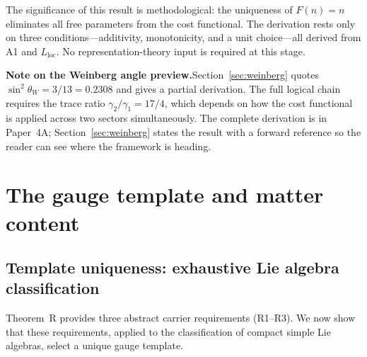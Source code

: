 \documentclass[11pt]{article}
\begin{document}
The significance of this result is methodological: the uniqueness of $F(n) = n$ eliminates all free parameters from the cost functional.  The derivation rests only on three conditions---additivity, monotonicity, and a unit choice---all derived from A1 and $L_{\mathrm{loc}}$.  No representation-theory input is required at this stage.

\smallskip
\noindent\textbf{Note on the Weinberg angle preview.}\quad Section~\ref{sec:weinberg} quotes $\sin^2\theta_W = 3/13 = 0.2308$ and gives a partial derivation.  The full logical chain requires the trace ratio $\gamma_2/\gamma_1 = 17/4$, which depends on how the cost functional is applied across two sectors simultaneously.  The complete derivation is in Paper~4A; Section~\ref{sec:weinberg} states the result with a forward reference so the reader can see where the framework is heading.


\section{The gauge template and matter content}
\label{sec:gauge_template}

\subsection{Template uniqueness: exhaustive Lie algebra classification}

Theorem~R provides three abstract carrier requirements (R1--R3).  We now show that these requirements, applied to the classification of compact simple Lie algebras, select a unique gauge template.
\end{document}
